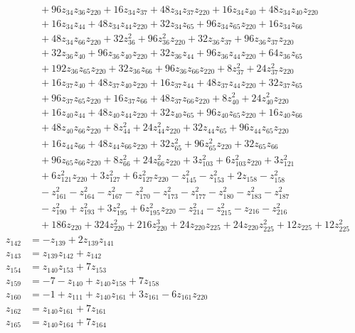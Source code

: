 \documentclass[11pt]{article}
\theoremstyle{remark}
\begin{document}
\begin{align*}
&\quad{}+96z_{34} z_{36} z_{220}+16z_{34} z_{37}+48z_{34} z_{37} z_{220}+16z_{34} z_{40}+48z_{34} z_{40} z_{220}\\
&\quad{}+16z_{34} z_{44}+48z_{34} z_{44} z_{220}+32z_{34} z_{65}+96z_{34} z_{65} z_{220}+16z_{34} z_{66}\\
&\quad{}+48z_{34} z_{66} z_{220}+32z_{36}^{2}+96z_{36}^{2} z_{220}+32z_{36} z_{37}+96z_{36} z_{37} z_{220}\\
&\quad{}+32z_{36} z_{40}+96z_{36} z_{40} z_{220}+32z_{36} z_{44}+96z_{36} z_{44} z_{220}+64z_{36} z_{65}\\
&\quad{}+192z_{36} z_{65} z_{220}+32z_{36} z_{66}+96z_{36} z_{66} z_{220}+8z_{37}^{2}+24z_{37}^{2} z_{220}\\
&\quad{}+16z_{37} z_{40}+48z_{37} z_{40} z_{220}+16z_{37} z_{44}+48z_{37} z_{44} z_{220}+32z_{37} z_{65}\\
&\quad{}+96z_{37} z_{65} z_{220}+16z_{37} z_{66}+48z_{37} z_{66} z_{220}+8z_{40}^{2}+24z_{40}^{2} z_{220}\\
&\quad{}+16z_{40} z_{44}+48z_{40} z_{44} z_{220}+32z_{40} z_{65}+96z_{40} z_{65} z_{220}+16z_{40} z_{66}\\
&\quad{}+48z_{40} z_{66} z_{220}+8z_{44}^{2}+24z_{44}^{2} z_{220}+32z_{44} z_{65}+96z_{44} z_{65} z_{220}\\
&\quad{}+16z_{44} z_{66}+48z_{44} z_{66} z_{220}+32z_{65}^{2}+96z_{65}^{2} z_{220}+32z_{65} z_{66}\\
&\quad{}+96z_{65} z_{66} z_{220}+8z_{66}^{2}+24z_{66}^{2} z_{220}+3z_{103}^{2}+6z_{103}^{2} z_{220}+3z_{121}^{2}\\
&\quad{}+6z_{121}^{2} z_{220}+3z_{127}^{2}+6z_{127}^{2} z_{220}-z_{145}^{2}-z_{153}^{2}+2z_{158}-z_{158}^{2}\\
&\quad{}-z_{161}^{2}-z_{164}^{2}-z_{167}^{2}-z_{170}^{2}-z_{173}^{2}-z_{177}^{2}-z_{180}^{2}-z_{183}^{2}-z_{187}^{2}\\
&\quad{}-z_{190}^{2}+z_{193}^{2}+3z_{195}^{2}+6z_{195}^{2} z_{220}-z_{214}^{2}-z_{215}^{2}-z_{216}-z_{216}^{2}\\
&\quad{}+186z_{220}+324z_{220}^{2}+216z_{220}^{3}+24z_{220} z_{225}+24z_{220} z_{225}^{2}+12z_{225}+12z_{225}^{2}\\[3pt]
z_{142}&=-z_{139}+2z_{139} z_{141}\\[3pt]
z_{143}&=z_{139} z_{142}+z_{142}\\[3pt]
z_{154}&=z_{140} z_{153}+7z_{153}\\[3pt]
z_{159}&=-7-z_{140}+z_{140} z_{158}+7z_{158}\\[3pt]
z_{160}&=-1+z_{111}+z_{140} z_{161}+3z_{161}-6z_{161} z_{220}\\[3pt]
z_{162}&=z_{140} z_{161}+7z_{161}\\[3pt]
z_{165}&=z_{140} z_{164}+7z_{164}
\end{align*}
\end{document}
